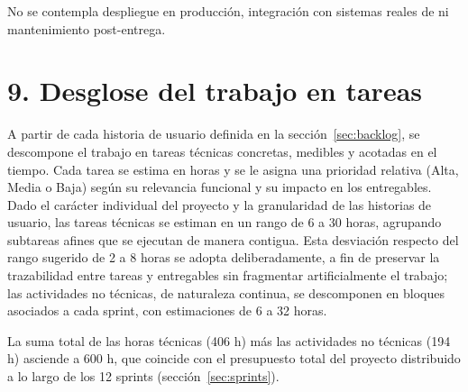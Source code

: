 \documentclass[
  11pt, %
]{charter}
\begin{document}
No se contempla despliegue en producción, integración con sistemas reales de \empclientename\hspace{1px} ni mantenimiento post-entrega.

\section{9. Desglose del trabajo en tareas}
\label{sec:wbs}

A partir de cada historia de usuario definida en la sección~\ref{sec:backlog}, se descompone el trabajo en tareas técnicas concretas, medibles y acotadas en el tiempo. Cada tarea se estima en horas y se le asigna una prioridad relativa (Alta, Media o Baja) según su relevancia funcional y su impacto en los entregables. Dado el carácter individual del proyecto y la granularidad de las historias de usuario, las tareas técnicas se estiman en un rango de 6 a 30 horas, agrupando subtareas afines que se ejecutan de manera contigua. Esta desviación respecto del rango sugerido de 2 a 8 horas se adopta deliberadamente, a fin de preservar la trazabilidad entre tareas y entregables sin fragmentar artificialmente el trabajo; las actividades no técnicas, de naturaleza continua, se descomponen en bloques asociados a cada sprint, con estimaciones de 6 a 32 horas.

La suma total de las horas técnicas (406 h) más las actividades no técnicas (194 h) asciende a 600 h, que coincide con el presupuesto total del proyecto distribuido a lo largo de los 12 sprints (sección~\ref{sec:sprints}).
\end{document}

